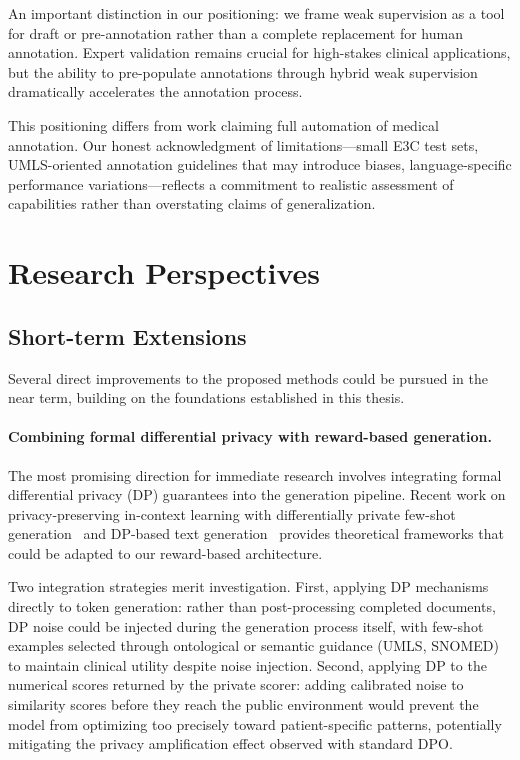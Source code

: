 An important distinction in our positioning: we frame weak supervision as a tool for draft or pre-annotation rather than a complete replacement for human annotation.
Expert validation remains crucial for high-stakes clinical applications, but the ability to pre-populate annotations through hybrid weak supervision dramatically accelerates the annotation process.

This positioning differs from work claiming full automation of medical annotation.
Our honest acknowledgment of limitations—small E3C test sets, UMLS-oriented annotation guidelines that may introduce biases, language-specific performance variations—reflects a commitment to realistic assessment of capabilities rather than overstating claims of generalization.


\section{Research Perspectives}


\subsection{Short-term Extensions}

Several direct improvements to the proposed methods could be pursued in the near term, building on the foundations established in this thesis.

\paragraph{Combining formal differential privacy with reward-based generation.}

The most promising direction for immediate research involves integrating formal differential privacy (DP) guarantees into the generation pipeline.
Recent work on privacy-preserving in-context learning with differentially private few-shot generation~\cite{tangPrivacyPreservingInContextLearning2023} and DP-based text generation~\cite{nageshPrivateTextGeneration2025} provides theoretical frameworks that could be adapted to our reward-based architecture.

Two integration strategies merit investigation.
First, applying DP mechanisms directly to token generation: rather than post-processing completed documents, DP noise could be injected during the generation process itself, with few-shot examples selected through ontological or semantic guidance (UMLS, SNOMED) to maintain clinical utility despite noise injection.
Second, applying DP to the numerical scores returned by the private scorer: adding calibrated noise to similarity scores before they reach the public environment would prevent the model from optimizing too precisely toward patient-specific patterns, potentially mitigating the privacy amplification effect observed with standard DPO.


